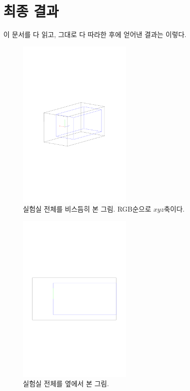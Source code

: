 \chapter{최종 결과 \label{chapter-2}}

이 문서를 다 읽고, 그대로 다 따라한 후에 얻어낸 결과는 이렇다.

\begin{figure}[h]
\centering\includegraphics[width=0.5\textwidth]{tex/tiltview.pdf}
\centering\caption{실험실 전체를 비스듬히 본 그림. RGB순으로 $xyz$축이다.}
\end{figure}

\begin{figure}[h]
\centering\includegraphics[width=0.5\textwidth]{tex/sideview.pdf}
\centering\caption{실험실 전체를 옆에서 본 그림.}
\end{figure}

